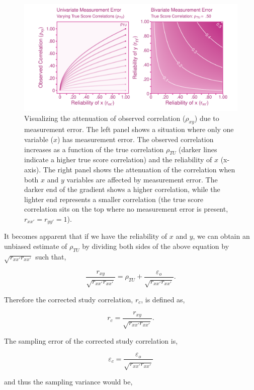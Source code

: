 \documentclass[
  letterpaper,
  DIV=11,
  numbers=noendperiod]{scrreprt}
\begin{document}
\begin{figure}

{\centering \includegraphics{unreliability_files/figure-pdf/unnamed-chunk-10-1.pdf}

}

\caption{Visualizing the attenuation of observed correlation
(\(\rho_{xy}\)) due to measurement error. The left panel shows a
situation where only one variable (\(x\)) has measurement error. The
observed correlation increases as a function of the true correlation
\(\rho_{TU}\) (darker lines indicate a higher true score correlation)
and the reliability of \(x\) (x-axis). The right panel shows the
attenuation of the correlation when both \(x\) and \(y\) variables are
affected by measurement error. The darker end of the gradient shows a
higher correlation, while the lighter end represents a smaller
correlation (the true score correlation sits on the top where no
measurement error is present, \(r_{xx'}=r_{yy'}=1\)).}

\end{figure}

It becomes apparent that if we have the reliability of \(x\) and \(y\),
we can obtain an unbiased estimate of \(\rho_{TU}\) by dividing both
sides of the above equation by \(\sqrt{r_{xx'}r_{xx'}}\) such that,

\[
\frac{r_{xy}}{\sqrt{r_{xx'}r_{xx'}}} =\rho_{TU} + \frac{\varepsilon_o}{\sqrt{r_{xx'}r_{xx'}}}.
\]

Therefore the corrected study correlation, \(r_c\), is defined as,

\[
r_c = \frac{r_{xy}}{\sqrt{r_{xx'}r_{xx'}}}.
\]

The sampling error of the corrected study correlation is,

\[
\varepsilon_c = \frac{\varepsilon_{o}}{\sqrt{r_{xx'}r_{xx'}}}
\]

and thus the sampling variance would be,
\end{document}

